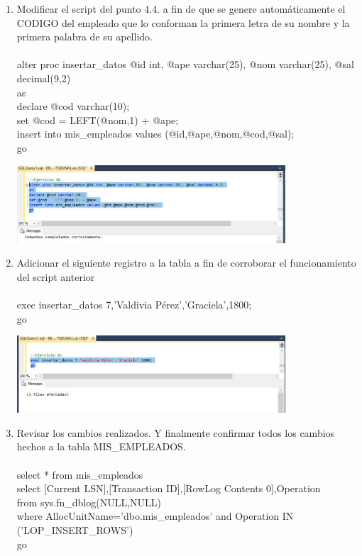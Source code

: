\begin{enumerate}[1.]
	\item Modificar el script del punto 4.4. a fin de que se genere automáticamente el CODIGO del empleado que lo conforman la primera letra de su nombre y la primera palabra de su apellido.
          \\
          \\ alter proc insertar\_datos @id int, @ape varchar(25), @nom varchar(25), @sal decimal(9,2)
          \\as
          \\declare @cod varchar(10);
          \\set @cod = LEFT(@nom,1) + @ape; 
          \\insert into mis\_empleados values (@id,@ape,@nom,@cod,@sal);
          \\go

	\begin{center}
	\includegraphics[width=10cm]{./Imagenes/1ejer20} 
	\end{center}

	\item Adicionar el siguiente registro a la tabla a fin de corroborar el funcionamiento del script anterior
           \\
           \\exec insertar\_datos 7,'Valdivia Pérez','Graciela',1800;
           \\go

	\begin{center}
	\includegraphics[width=10cm]{./Imagenes/1ejer21} 
	\end{center}

	\item Revisar los cambios realizados. Y finalmente confirmar todos los cambios hechos a la tabla MIS\_EMPLEADOS.
          \\
          \\select * from mis\_empleados
          \\select [Current LSN],[Transaction ID],[RowLog Contents 0],Operation 
          \\from sys.fn\_dblog(NULL,NULL) 
          \\where AllocUnitName='dbo.mis\_empleados' and Operation IN ('LOP\_INSERT\_ROWS')
          \\go


\end{enumerate}
